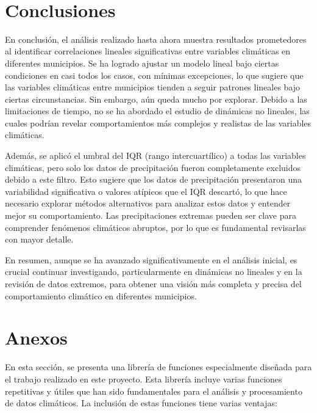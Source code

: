 \documentclass[11pt]{article}
\begin{document}
    \begin{center}
    \end{center}
    { \hspace*{\fill} \\}
    
    \hypertarget{conclusiones}{%
\section{Conclusiones}\label{conclusiones}}

    En conclusión, el análisis realizado hasta ahora muestra resultados
prometedores al identificar correlaciones lineales significativas entre
variables climáticas en diferentes municipios. Se ha logrado ajustar un
modelo lineal bajo ciertas condiciones en casi todos los casos, con
mínimas excepciones, lo que sugiere que las variables climáticas entre
municipios tienden a seguir patrones lineales bajo ciertas
circunstancias. Sin embargo, aún queda mucho por explorar. Debido a las
limitaciones de tiempo, no se ha abordado el estudio de dinámicas no
lineales, las cuales podrían revelar comportamientos más complejos y
realistas de las variables climáticas.

Además, se aplicó el umbral del IQR (rango intercuartílico) a todas las
variables climáticas, pero solo los datos de precipitación fueron
completamente excluidos debido a este filtro. Esto sugiere que los datos
de precipitación presentaron una variabilidad significativa o valores
atípicos que el IQR descartó, lo que hace necesario explorar métodos
alternativos para analizar estos datos y entender mejor su
comportamiento. Las precipitaciones extremas pueden ser clave para
comprender fenómenos climáticos abruptos, por lo que es fundamental
revisarlas con mayor detalle.

En resumen, aunque se ha avanzado significativamente en el análisis
inicial, es crucial continuar investigando, particularmente en dinámicas
no lineales y en la revisión de datos extremos, para obtener una visión
más completa y precisa del comportamiento climático en diferentes
municipios.

    \hypertarget{anexos}{%
\section{Anexos}\label{anexos}}

    En esta sección, se presenta una librería de funciones especialmente
diseñada para el trabajo realizado en este proyecto. Esta librería
incluye varias funciones repetitivas y útiles que han sido fundamentales
para el análisis y procesamiento de datos climáticos. La inclusión de
estas funciones tiene varias ventajas:
\end{document}
